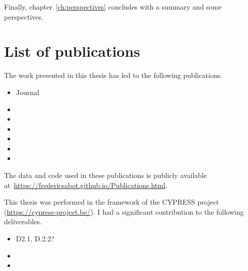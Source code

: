 Finally, chapter~\ref{ch:perspectives} concludes with a summary and some perspectives.

\section{List of publications}

The work presented in this thesis has led to the following publications.

\begin{itemize}
    \item Journal
    \item {}
    \item {}
    \item {}
    \item {}
    \item {}
    \item {}
\end{itemize}

The data and code used in these publications is publicly available at~\url{https://fredericsabot.github.io/Publications.html}.

This thesis was performed in the framework of the CYPRESS project (\url{https://cypress-project.be/}). I had a significant contribution to the following deliverables.

\begin{itemize}
    \item D2.1, D.2.2?
    \item {}
    \item {}
\end{itemize}
